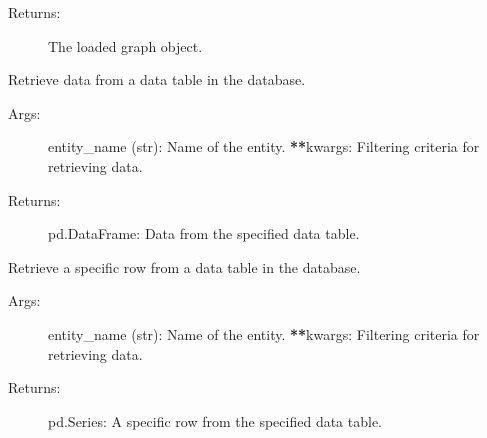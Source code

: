 \documentclass[letterpaper,10pt,english]{sphinxmanual}
\begin{document}
\begin{fulllineitems}
\begin{fulllineitems}
\begin{description}
\item[{Returns:}] \leavevmode
\sphinxAtStartPar
The loaded graph object.

\end{description}

\end{fulllineitems}


\begin{fulllineitems}
\label{\detokenize{eda_schema:eda_schema.db.SQLitePickleDB.get_table_data}}
\pysigstartsignatures
{}
\pysigstopsignatures
\sphinxAtStartPar
Retrieve data from a data table in the database.
\begin{description}
\item[{Args:}] \leavevmode
\sphinxAtStartPar
entity\_name (str): Name of the entity.
{\color{red}\bfseries{}**}kwargs: Filtering criteria for retrieving data.

\item[{Returns:}] \leavevmode
\sphinxAtStartPar
pd.DataFrame: Data from the specified data table.

\end{description}

\end{fulllineitems}


\begin{fulllineitems}
\label{\detokenize{eda_schema:eda_schema.db.SQLitePickleDB.get_table_row}}
\pysigstartsignatures
{}
\pysigstopsignatures
\sphinxAtStartPar
Retrieve a specific row from a data table in the database.
\begin{description}
\item[{Args:}] \leavevmode
\sphinxAtStartPar
entity\_name (str): Name of the entity.
{\color{red}\bfseries{}**}kwargs: Filtering criteria for retrieving data.

\item[{Returns:}] \leavevmode
\sphinxAtStartPar
pd.Series: A specific row from the specified data table.


\end{description}
\end{fulllineitems}
\end{fulllineitems}
\end{document}
